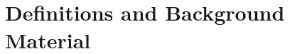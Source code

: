 \section{Definitions and Background Material}\label{section:backwaters}

\begin{comment}
\subsection{Symplectic Groups}\label{subsection:stimpy}

Fix a commutative ring $R$, a finitely-generated free $R$-module $M$ of rank $2n$ for some positive integer $n$, and a non-degenerate alternating bilinear form $\langle -, - \rangle : M \times M \to R$. Define the group of $\GSp(M)$ to be the subgroup of $\on{GL}(M)$ consisting of all $R$-automorphisms $S$ such that for some $m_S \in R^\times$, called the multiplier of $S$, we have $\langle S v, Sw \rangle = m_S \cdot \langle v, w \rangle$. One readily observes that the map $\on{mult} : \GSp(M) \to R^\times$ defined by $S \mapsto m_S$ is a group homomorphism, and its kernel is denoted by $\Sp(M)$.

By choosing a suitable $R$-basis for $M$, we can arrange for the corresponding matrix of the inner product $\langle -, - \rangle$ to be given by
$$\Omega_n = \left[\begin{array}{c|c} 0 & \id_n \\ \hline -\id_n & 0\end{array}\right],$$
where $\id_n$ denotes the $n \times n$ identity matrix. From this choice of basis we obtain an identification $\GL(M) \simeq \GL_{2n}(R)$. We then define $\GSp_{2n}(R)$ to be the image of $\GSp(M)$ and $\Sp_{2n}(R)$ to be the image of $\Sp(M)$ under this identification. Let $\det : \GL_{2n}(R) \to R^\times$ be the determinant map. Upon noticing that the diagram

\begin{center}
\begin{tikzcd}
\GSp(M) \arrow{r}{\sim} \arrow[swap]{rd}{\on{mult}^n} &  \GSp_{2n}(R) \arrow{d}{\on{det}} \\
& R^\times
\end{tikzcd}
\end{center}

\noindent commutes, where the diagonal map is the multiplier map raised to the $n^{\mathrm{th}}$ power, one deduces that $\GSp_{2n}(R)$ is in fact the subgroup of $\GL_{2n}(R)$ consisting of all invertible matrices $S$ satisfying $S^T \Omega S = (\on{mult} S) \, \Omega$ and that $\Sp_{2n}(R) = \ker(\on{mult} : \GSp_{2n}(R) \to R^\times)$. The groups $\GSp(M)$ and $\GSp_{2n}(R)$ are typically referred to as general symplectic groups, or groups of symplectic similitudes, while the groups $\Sp(M)$ and $\Sp_{2n}(R)$ are usually just \mbox{called symplectic groups.}


\end{comment}
